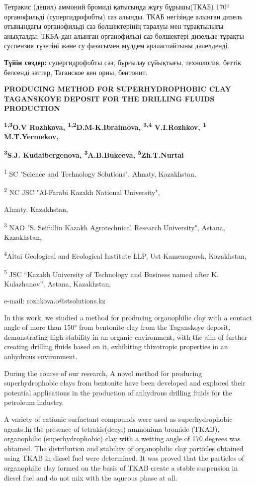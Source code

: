 Тетракис (децил) аммоний бромиді қатысында жұғу бұрышы(ТКАБ) 170º
органофильді (супергидрофобты) саз алынды. ТКАБ негізінде алынған дизель
отынындағы органофильді саз бөлшектерінің таралуы мен тұрақтылығы
анықталды. ТКБА-дан алынған органофильді саз бөлшектері дизельде тұрақты
суспензия түзетіні және су фазасымен мүлдем араласпайтыны дәлелденді.

\textbf{Түйін сөздер:} супергидрофобты саз, бұрғылау сұйықтығы,
технология, беттік белсенді заттар, Таганское кен орны, бентонит.

\textbf{PRODUCING METHOD FOR SUPERHYDROPHOBIC CLAY TAGANSKOYE DEPOSIT
FOR THE DRILLING FLUIDS PRODUCTION}

\textbf{\textsuperscript{1,3}O.V Rozhkova,
\textsuperscript{1,2}D.M-K.Ibraimova, \textsuperscript{3,4} V.I.Rozhkov,
\textsuperscript{1} M.T.Yermekov,}

\textbf{\textsuperscript{3}S.J. Kudaibergenova,
\textsuperscript{3}A.B.Bukeeva, \textsuperscript{5}Zh.T.Nurtai}

\textsuperscript{1} SC "Science and Technology Solutions", Almaty,
Kazakhstan,

\textsuperscript{2} NC JSC "Al-Farabi Kazakh National University",

Almaty, Kazakhstan,

\textsuperscript{3} NAO "S. Seifullin Kazakh Agrotechnical Research
University", Astana, Kazakhstan,

\textsuperscript{4}Altai Geological and Ecological Institute LLP,
Ust-Kamenogorsk, Kazakhstan,

\textsuperscript{5} JSC ``Kazakh University of Technology and Business
named after K. Kulazhanov'', Astana, Kazakhstan,

e-mail: rozhkova.o@stsolutions.kz

In this work, we studied a method for producing organophilic clay with a
contact angle of more than 150° from bentonite clay from the Taganskoye
deposit, demonstrating high stability in an organic environment, with
the aim of further creating drilling fluids based on it, exhibiting
thixotropic properties in an anhydrous environment.

During the course of our research, A novel method for producing
superhydrophobic clays from bentonite have been developed and explored
their potential applications in the production of anhydrous drilling
fluids for the petroleum industry.

A variety of cationic surfactant compounds were used as superhydrophobic
agents.In the presence of tetrakis(decyl) ammonium bromide (TKAB),
organophilic (superhydrophobic) clay with a wetting angle of 170 degrees
was obtained. The distribution and stability of organophilic clay
particles obtained using TKAB in diesel fuel were determined. It was
proved that the particles of organophilic clay formed on the basis of
TKAB create a stable suspension in diesel fuel and do not mix with the
aqueous phase at all.

